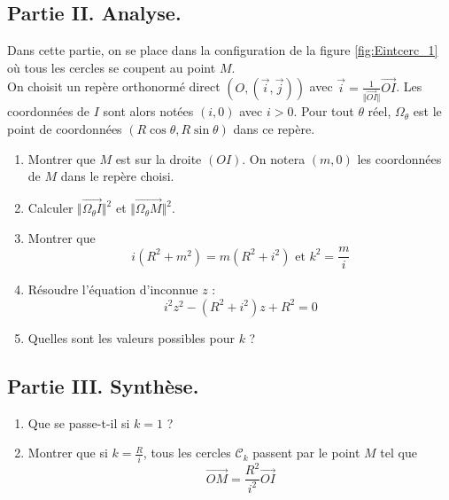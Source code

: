 \subsection*{Partie II. Analyse.}
 Dans cette partie, on se place dans la configuration de la figure \ref{fig:Eintcerc_1} où tous les cercles se coupent au point $M$.\\
On choisit un repère orthonormé direct $(O,(\overrightarrow i, \overrightarrow j))$ avec $\overrightarrow i =\frac{1}{\Vert \overrightarrow{OI}\Vert}\overrightarrow{OI}$. Les coordonnées de $I$ sont alors notées $(i,0)$ avec $i>0$. Pour tout $\theta$ réel, $\Omega_\theta$ est le point de coordonnées $(R\cos \theta, R\sin \theta)$ dans ce repère.
\begin{enumerate}
 \item Montrer que $M$ est sur la droite $(OI)$. On notera $(m,0)$ les coordonnées de $M$ dans le repère choisi.
 \item Calculer $\Vert\overrightarrow{\Omega_\theta I}\Vert^2$ et $\Vert\overrightarrow{\Omega_\theta M}\Vert^2$.
 \item Montrer que
\begin{displaymath}
 i(R^2+m^2) = m(R^2+i^2) \text{ et } k^2 = \frac{m}{i}
\end{displaymath}
\item Résoudre l'équation d'inconnue $z$ :
\begin{displaymath}
 i^2z^2 - (R^2+i^2)z + R^2=0
\end{displaymath}
\item Quelles sont les valeurs possibles pour $k$ ?
\end{enumerate}

\subsection*{Partie III. Synthèse.}
\begin{enumerate}
 \item Que se passe-t-il si $k=1$ ?
 \item Montrer que si $k=\frac{R}{i}$, tous les cercles $\mathcal{C}_k$ passent par le point $M$ tel que
\begin{displaymath}
 \overrightarrow{OM} = \frac{R^2}{i^2}\overrightarrow{OI}
\end{displaymath}
\end{enumerate}